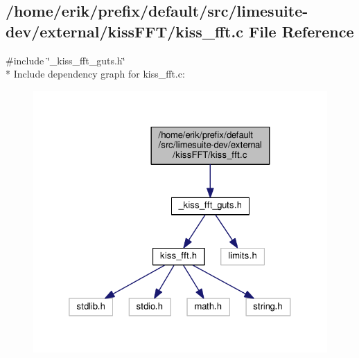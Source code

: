 \subsection{/home/erik/prefix/default/src/limesuite-\/dev/external/kiss\+F\+F\+T/kiss\+\_\+fft.c File Reference}
\label{kiss__fft_8c}
{\ttfamily \#include \char`\"{}\+\_\+kiss\+\_\+fft\+\_\+guts.\+h\char`\"{}}\\*
Include dependency graph for kiss\+\_\+fft.\+c\+:
\nopagebreak
\begin{figure}[H]
\begin{center}
\leavevmode
\includegraphics[width=325pt]{d4/dea/kiss__fft_8c__incl}
\end{center}
\end{figure}
